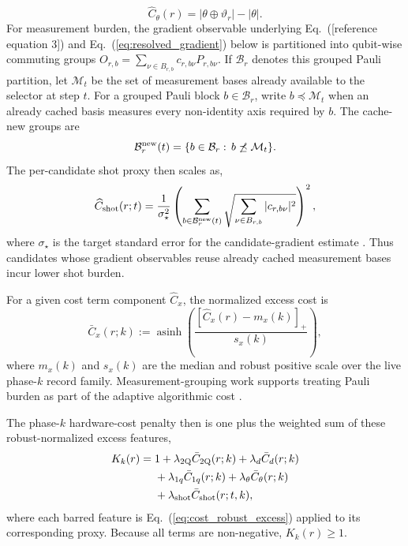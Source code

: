 \documentclass[
  reprint,
  amsmath,
  amssymb,
  aps,
  pra,
  nofootinbib,
  superscriptaddress,
  floatfix
]{revtex4-2}
\newcommand{\placeholder}[1]{\textcolor{red!70!black}{\ifmmode\left[#1\right]\else\textsf{[#1]}\fi}}
\newcommand{\twq}{\mathrm{2Q}}
\begin{document}
\begin{equation}
\widehat C_\theta(r)
=
|\theta\oplus\vartheta_r|-|\theta|.
\label{eq:parameter_cost_proxy}
\end{equation}
For measurement burden, the gradient observable underlying Eq.~(\placeholder{reference equation 3}) and Eq.~(\ref{eq:resolved_gradient}) below is partitioned into qubit-wise commuting groups $O_{r,b}=\sum_{\nu\in B_{r,b}}c_{r,b\nu}P_{r,b\nu}$. If $\mathcal B_r$ denotes this grouped Pauli partition, let $\mathcal M_t$ be the set of measurement bases already available to the selector at step $t$. For a grouped Pauli block $b\in\mathcal B_r$, write $b\preceq\mathcal M_t$ when an already cached basis measures every non-identity axis required by $b$. The cache-new groups are
\begin{equation}
\mathcal B_r^{\rm new}(t)
=
\{b\in\mathcal B_r:\,b\not\preceq\mathcal M_t\}.
\label{eq:cache_new_measurement_groups}
\end{equation}
The per-candidate shot proxy then scales as,
\begin{equation}
\widehat C_{\rm shot}(r;t)=
\frac{1}{\sigma_\star^2}
\left(
\sum_{b\in\mathcal B_r^{\rm new}(t)}
\sqrt{\sum_{\nu\in B_{r,b}}|c_{r,b\nu}|^2}
\right)^2,
\label{eq:shot_cost_proxy}
\end{equation}
where $\sigma_\star$ is the target standard error for the candidate-gradient estimate \cite{Ikhtiarudin2025ShotEfficient}. Thus candidates whose gradient observables reuse already cached measurement bases incur lower shot burden.

For a given cost term component $\widehat C_x$, the normalized excess cost is
\begin{equation}
\bar C_x(r;k):=
\operatorname{asinh}
\left(
\frac{[\widehat C_x(r)-m_x(k)]_+}{s_x(k)}
\right),
\label{eq:cost_robust_excess}
\end{equation}
where $m_x(k)$ and $s_x(k)$ are the median and robust positive scale over the live phase-$k$ record family. Measurement-grouping work supports treating Pauli burden as part of the adaptive algorithmic cost \cite{Verteletskyi2020CliqueCover,Yen2020CompatibleMeasurements}.

The phase-$k$ hardware-cost penalty then is one plus the weighted sum of these robust-normalized excess features,
\begin{equation}
\begin{aligned}
K_k(r)
={}&
1+\lambda_{\twq}\bar C_{\twq}(r;k)
+\lambda_d \bar C_d(r;k)\\
&+\lambda_{1q}\bar C_{1q}(r;k)
 +\lambda_\theta \bar C_\theta(r;k)\\
&+\lambda_{\rm shot}\bar C_{\rm shot}(r;t,k),
\end{aligned}
\label{eq:hardware_cost_sum}
\end{equation}
where each barred feature is Eq.~(\ref{eq:cost_robust_excess}) applied to its corresponding proxy. Because all terms are non-negative, $K_k(r)\ge1$.
\end{document}

